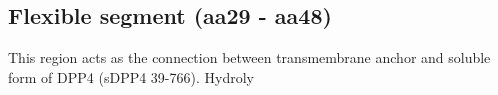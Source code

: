 \subsection{Flexible segment (aa29 - aa48)}

This region acts as the connection between transmembrane anchor and soluble form of DPP4 (sDPP4 39-766). Hydroly
